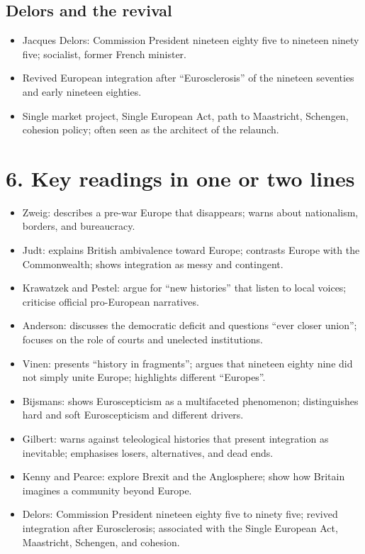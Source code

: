 \documentclass[10pt,a4paper]{article}
\begin{document}
\subsection*{Delors and the revival}
\begin{itemize}
\item Jacques Delors: Commission President nineteen eighty five to nineteen ninety five; socialist, former French minister.
\item Revived European integration after ``Eurosclerosis'' of the nineteen seventies and early nineteen eighties.
\item Single market project, Single European Act, path to Maastricht, Schengen, cohesion policy; often seen as the architect of the relaunch.
\end{itemize}

\section*{6. Key readings in one or two lines}
\begin{itemize}
\item Zweig: describes a pre-war Europe that disappears; warns about nationalism, borders, and bureaucracy.
\item Judt: explains British ambivalence toward Europe; contrasts Europe with the Commonwealth; shows integration as messy and contingent.
\item Krawatzek and Pestel: argue for “new histories” that listen to local voices; criticise official pro-European narratives.
\item Anderson: discusses the democratic deficit and questions “ever closer union”; focuses on the role of courts and unelected institutions.
\item Vinen: presents “history in fragments”; argues that nineteen eighty nine did not simply unite Europe; highlights different “Europes”.
\item Bijsmans: shows Euroscepticism as a multifaceted phenomenon; distinguishes hard and soft Euroscepticism and different drivers.
\item Gilbert: warns against teleological histories that present integration as inevitable; emphasises losers, alternatives, and dead ends.
\item Kenny and Pearce: explore Brexit and the Anglosphere; show how Britain imagines a community beyond Europe.
\item Delors: Commission President nineteen eighty five to ninety five; revived integration after Eurosclerosis; associated with the Single European Act, Maastricht, Schengen, and cohesion.
\end{itemize}
\end{document}
